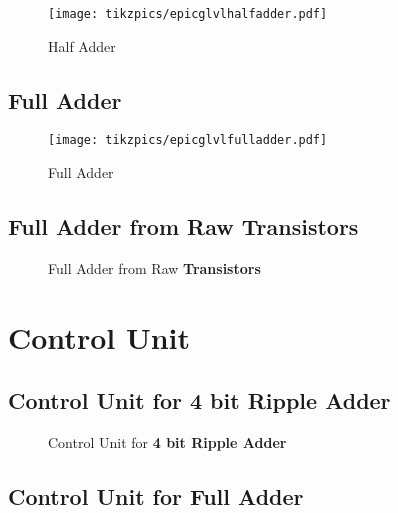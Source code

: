 \documentclass[a4paper, 10pt]{article}
\begin{document}
\begin{figure}[!ht]
	\centering
    \texttt{[image: tikzpics/epicglvlhalfadder.pdf]}
	\caption{Half Adder}
\end{figure}

\vspace{0.2\textheight}

\subsection{Full Adder}

\begin{figure}[!hb]
	\centering
    \texttt{[image: tikzpics/epicglvlfulladder.pdf]}
	\caption{Full Adder}
\end{figure}

\clearpage

\subsection{Full Adder from Raw \textbf{Transistors}}

\begin{figure}[!h]
	\centering
	\caption{Full Adder from Raw \textbf{Transistors}}
\end{figure}

\clearpage

\section{Control Unit}

\subsection{Control Unit for 4 bit Ripple Adder}

\begin{figure}[!h]
    \centering
    \caption{Control Unit for \textbf{4 bit Ripple Adder}}
\end{figure}


\clearpage

\subsection{Control Unit for Full Adder}
\end{document}
